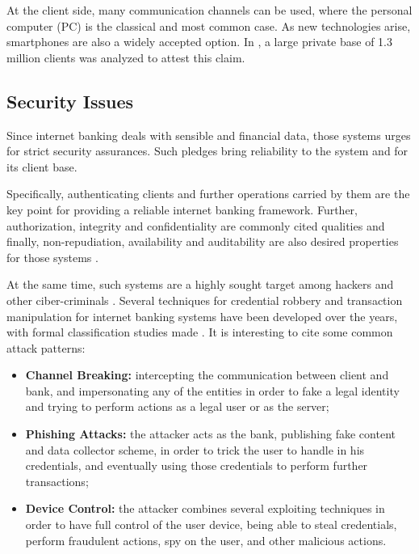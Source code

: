 At the client side, many communication channels can be used, where the personal computer (PC) is the classical and most common case. As new technologies arise, smartphones are also a widely accepted option. In \cite{Peotta2012}, a large private base of 1.3 million clients was analyzed to attest this claim.

\subsection{Security Issues}
Since internet banking deals with sensible and financial data, those systems urges for strict security assurances. Such pledges bring reliability to the system and for its client base.

Specifically, authenticating clients and further operations carried by them are the key point for providing a reliable internet banking framework. Further, authorization, integrity and confidentiality are commonly cited qualities and finally, non-repudiation, availability and auditability are also desired properties for those systems \cite{Hutchinson2003}.

At the same time, such systems are a highly sought target among hackers and other ciber-criminals \cite{Peotta2011, Hutchinson2003}. Several techniques for credential robbery and transaction manipulation for internet banking systems have been developed over the years, with formal classification studies made \cite{Peotta2011, Adham2013}. It is interesting to cite some common attack patterns:

\begin{itemize}
  \item \textbf{Channel Breaking:} intercepting the communication between client and bank, and impersonating any of the entities in order to fake a legal identity and trying to perform actions as a legal user or as the server;

  \item \textbf{Phishing Attacks:} the attacker acts as the bank, publishing fake content and data collector scheme, in order to trick the user to handle in his credentials, and eventually using those credentials to perform further transactions;

  \item \textbf{Device Control:} the attacker combines several exploiting techniques in order to have full control of the user device, being able to steal credentials, perform fraudulent actions, spy on the user, and other malicious actions.
\end{itemize}

